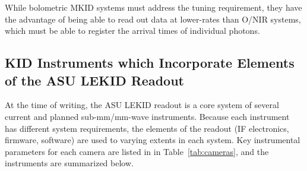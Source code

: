 While bolometric MKID systems must address the tuning requirement, they have the advantage of being able to read out data at lower-rates than O/NIR systems, which must be able to register the arrival times of individual photons.

\subsection{KID Instruments which Incorporate Elements of the ASU LEKID Readout}

At the time of writing, the ASU LEKID readout is a core system of several current and planned sub-mm/mm-wave instruments. Because each instrument has different system requirements, the elements of the readout (IF electronics, firmware, software) are used to varying extents in each system. Key instrumental parameters for each camera are listed in in Table~\ref{tab:cameras}, and the instruments are summarized below.

